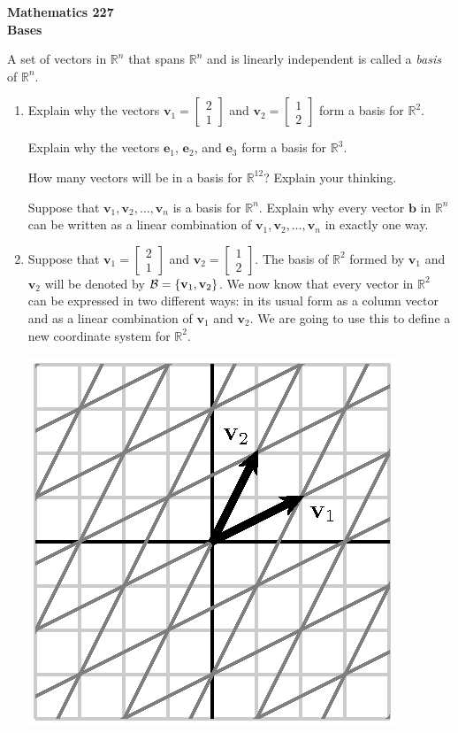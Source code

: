 \documentclass[12pt]{article}
\newcommand{\vs}[1]{\vspace{#1in}}
\newcommand{\bvec}{{\mathbf b}}
\newcommand{\evec}{{\mathbf e}}
\newcommand{\vvec}{{\mathbf v}}
\newcommand{\real}{{\mathbb R}}
\newcommand{\twovec}[2]{\left[\begin{array}{r}#1 \\ #2
    \end{array}\right]}
\newcommand{\bcal}{{\cal B}}
\begin{document}
\noindent
{\bf Mathematics 227} \\ 
{\bf Bases}

\bigskip
A set of vectors in $\real^n$ that spans $\real^n$ and is linearly
independent is called a {\em basis} of $\real^n$.

\begin{enumerate}
\item Explain why the vectors $\vvec_1=\twovec21$ and
  $\vvec_2=\twovec12$ form a basis for $\real^2$.

  \vs{1}
  Explain why the vectors $\evec_1$, $\evec_2$, and $\evec_3$ form a
  basis for $\real^3$.

  \vs{1}
  How many vectors will be in a basis for $\real^{12}$?  Explain your
  thinking.

  \vs{1}
  Suppose that $\vvec_1,\vvec_2,\ldots,\vvec_n$ is a basis for
  $\real^n$.  Explain why every vector $\bvec$ in $\real^n$ can be
  written as a linear combination of $\vvec_1,\vvec_2,\ldots,\vvec_n$
  in exactly one way.

  \vs{1}
\item Suppose that $\vvec_1=\twovec21$ and
  $\vvec_2=\twovec12$.  The basis of $\real^2$ formed by $\vvec_1$ and
  $\vvec_2$ will be denoted by $\bcal=\{\vvec_1,\vvec_2\}$.  We now know
  that every vector in $\real^2$ can be expressed in two different
  ways:  in its usual form as a column vector and as a linear
  combination of $\vvec_1$ and $\vvec_2$.  We are going to use this to
  define a new coordinate system for $\real^2$.

  \begin{center}
    \includegraphics{basis-1.eps}
  \end{center}


\end{enumerate}
\end{document}
